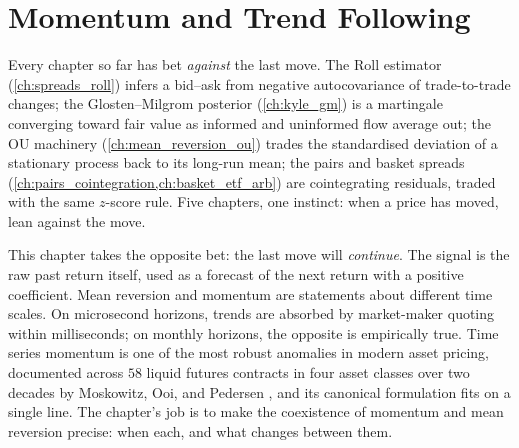 \chapter{Momentum and Trend Following}
\label{ch:momentum}

Every chapter so far has bet \emph{against} the last move. The
Roll estimator (\cref{ch:spreads_roll}) infers a bid--ask from
negative autocovariance of trade-to-trade changes; the
Glosten--Milgrom posterior (\cref{ch:kyle_gm}) is a martingale
converging toward fair value as informed and uninformed flow
average out; the OU machinery (\cref{ch:mean_reversion_ou}) trades
the standardised deviation of a stationary process back to its
long-run mean; the pairs and basket spreads
(\cref{ch:pairs_cointegration,ch:basket_etf_arb}) are cointegrating
residuals, traded with the same $z$-score rule. Five chapters, one
instinct: when a price has moved, lean against the move.

This chapter takes the opposite bet: the last move will
\emph{continue}. The signal is the raw past return itself, used as
a forecast of the next return with a positive coefficient. Mean
reversion and momentum are statements about different time scales.
On microsecond horizons, trends are absorbed by market-maker
quoting within milliseconds; on monthly horizons, the opposite is
empirically true. Time series momentum is one of the most robust
anomalies in modern asset pricing, documented across $58$ liquid
futures contracts in four asset classes over two decades by
Moskowitz, Ooi, and Pedersen \citeMOP, and its canonical
formulation fits on a single line. The chapter's job is to make
the coexistence of momentum and mean reversion precise: when
each, and what changes between them.

